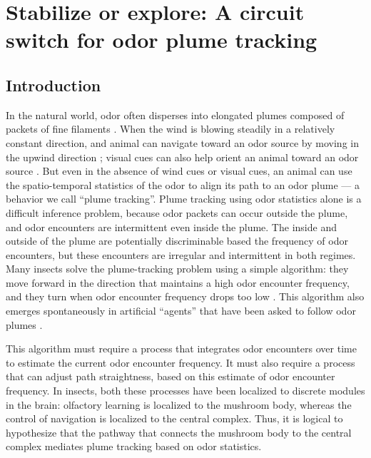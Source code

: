 \chapter{Stabilize or explore: A circuit switch for odor plume tracking}

\section{Introduction}

In the natural world, odor often disperses into elongated plumes composed of packets of fine filaments \citep{murlis2000, murlis1992}. %
When the wind is blowing steadily in a relatively constant direction, and animal can navigate toward an odor source by moving in the upwind direction \citep{vanbreugel2014, willis2005}; %
visual cues can also help orient an animal toward an odor source \citep{vanbreugel2014, duistermars2008}. %
But even in the absence of wind cues or visual cues, an animal can use the spatio-temporal statistics of the odor to align its path to an odor plume \citep{vickers1994, krishnan2011} --- a behavior we call ``plume tracking''. %
Plume tracking using odor statistics alone is a difficult inference problem, because odor packets can occur outside the plume, and odor encounters are intermittent even inside the plume. The inside and outside of the plume are potentially discriminable based the frequency of odor encounters, but these encounters are irregular and intermittent in both regimes. Many insects solve the plume-tracking problem using a simple algorithm: they move forward in the direction that maintains a high odor encounter frequency, and they turn when odor encounter frequency drops too low \citep{vickers1994, krishnan2011}. %
This algorithm also emerges spontaneously in artificial ``agents'' that have been asked to follow odor plumes \citep{singh2023}. %

This algorithm must require a process that integrates odor encounters over time to estimate the current odor encounter frequency. It must also require a process that can adjust path straightness, based on this estimate of odor encounter frequency. In insects, both these processes have been localized to discrete modules in the brain: olfactory learning is localized to the mushroom body, whereas the control of navigation is localized to the central complex. Thus, it is logical to hypothesize that the pathway that connects the mushroom body to the central complex mediates plume tracking based on odor statistics.

